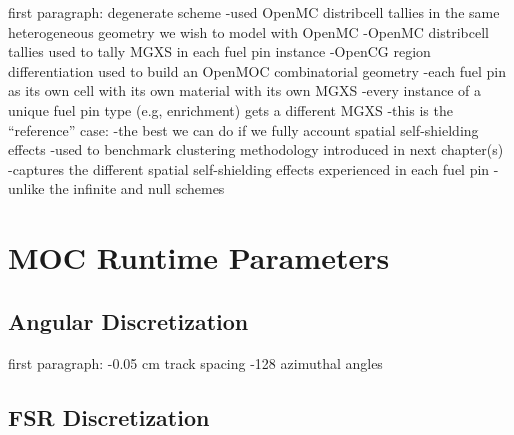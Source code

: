 first paragraph: degenerate scheme
-used OpenMC distribcell tallies in the same heterogeneous geometry we wish to model with OpenMC
-OpenMC distribcell tallies used to tally \ac{MGXS} in each fuel pin instance
-OpenCG region differentiation used to build an OpenMOC combinatorial geometry
  -each fuel pin as its own cell with its own material with its own \ac{MGXS}
-every instance of a unique fuel pin type (e.g, enrichment) gets a different \ac{MGXS}
-this is the ``reference'' case:
  -the best we can do if we fully account spatial self-shielding effects
  -used to benchmark clustering methodology introduced in next chapter(s)
-captures the different spatial self-shielding effects experienced in each fuel pin
  -unlike the infinite and null schemes


\section{\ac{MOC} Runtime Parameters}
\label{sec:chap8-moc-params}

\subsection{Angular Discretization}
\label{subsec:chap8-angular-discretizations}

first paragraph: 
-0.05 cm track spacing
-128 azimuthal angles

\subsection{\ac{FSR} Discretization}
\label{subsec:chap8-fsr-discretizations}

